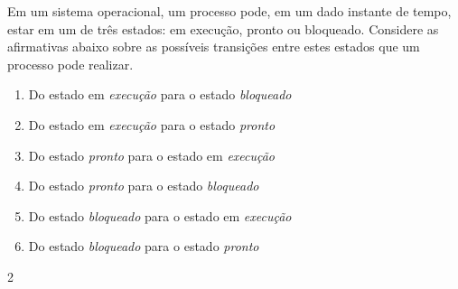 {
\def\AMCbeginQuestion#1#2{\par\noindent{\bf (POSCOMP 2004 - Questão 39)}}
\begin{question}{} Em um sistema operacional, um processo pode, em um dado instante de tempo, estar em um de três estados: em execução, pronto ou bloqueado. Considere as afirmativas abaixo sobre as possíveis transições entre estes estados que um processo pode realizar.
\begin{enumerate}[label=\Roman*.]
\item Do estado em \emph{execução} para o estado \emph{bloqueado}
\item Do estado em \emph{execução} para o estado \emph{pronto}
\item Do estado \emph{pronto} para o estado em \emph{execução}
\item Do estado \emph{pronto} para o estado \emph{bloqueado}
\item Do estado \emph{bloqueado} para o estado em \emph{execução}
\item Do estado \emph{bloqueado} para o estado \emph{pronto}
\end{enumerate}
\begin{multicols}{2}\columnseprule=0.1pt
\begin{choices}
\end{choices}
\end{multicols}
\end{question}
}

